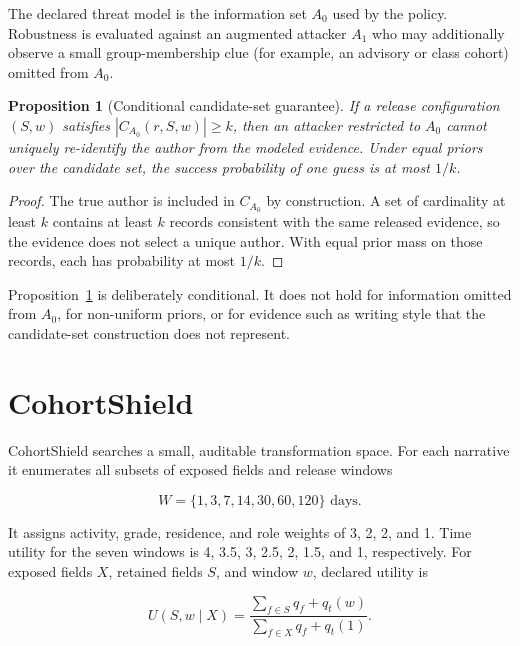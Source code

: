 \documentclass[pdflatex,sn-mathphys-num]{sn-jnl}
\theoremstyle{plain}
\newtheorem{proposition}{Proposition}
\begin{document}
The declared threat model is the information set $A_0$ used by the policy. Robustness is evaluated against an augmented attacker $A_1$ who may additionally observe a small group-membership clue (for example, an advisory or class cohort) omitted from $A_0$.

\begin{proposition}[Conditional candidate-set guarantee]\label{prop:guarantee}
If a release configuration $(S,w)$ satisfies $|C_{A_0}(r,S,w)|\geq k$, then an attacker restricted to $A_0$ cannot uniquely re-identify the author from the modeled evidence. Under equal priors over the candidate set, the success probability of one guess is at most $1/k$.
\end{proposition}

\begin{proof}
The true author is included in $C_{A_0}$ by construction. A set of cardinality at least $k$ contains at least $k$ records consistent with the same released evidence, so the evidence does not select a unique author. With equal prior mass on those records, each has probability at most $1/k$.
\end{proof}

Proposition~\ref{prop:guarantee} is deliberately conditional. It does not hold for information omitted from $A_0$, for non-uniform priors, or for evidence such as writing style that the candidate-set construction does not represent.

\section{CohortShield}\label{sec:method}

CohortShield searches a small, auditable transformation space. For each narrative it enumerates all subsets of exposed fields and release windows

\begin{equation}
W=\{1,3,7,14,30,60,120\}\text{ days}.
\end{equation}

It assigns activity, grade, residence, and role weights of 3, 2, 2, and 1. Time utility for the seven windows is 4, 3.5, 3, 2.5, 2, 1.5, and 1, respectively. For exposed fields $X$, retained fields $S$, and window $w$, declared utility is

\begin{equation}
U(S,w\mid X)=
\frac{\sum_{f\in S}q_f+q_t(w)}{\sum_{f\in X}q_f+q_t(1)}.
\label{eq:utility}
\end{equation}
\end{document}
